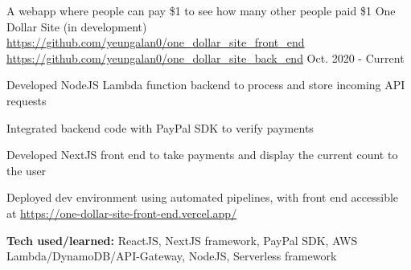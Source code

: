 \begin{cventries}
\vspace{-.25em}
\cventry
{A webapp where people can pay \$1 to see how many other people paid \$1} %
{One Dollar Site (in development)} %
{\href{https://github.com/yeungalan0/one\_dollar\_site\_front\_end}{https://github.com/yeungalan0/one\_dollar\_site\_front\_end} \href{https://github.com/yeungalan0/one\_dollar\_site\_back\_end}{https://github.com/yeungalan0/one\_dollar\_site\_back\_end}} %
{Oct. 2020 - Current} %
{ %
\begin{cvitems}
\item {Developed NodeJS Lambda function backend to process and store incoming API requests}
\item {Integrated backend code with PayPal SDK to verify payments}
\item {Developed NextJS front end to take payments and display the current count to the user}
\item {Deployed dev environment using automated pipelines, with front end accessible at \href{https://one-dollar-site-front-end.vercel.app/}{https://one-dollar-site-front-end.vercel.app/}}
\item {\textbf{Tech used/learned:} ReactJS, NextJS framework, PayPal SDK, AWS Lambda/DynamoDB/API-Gateway, NodeJS, Serverless framework}
\end{cvitems}
}




\end{cventries}
